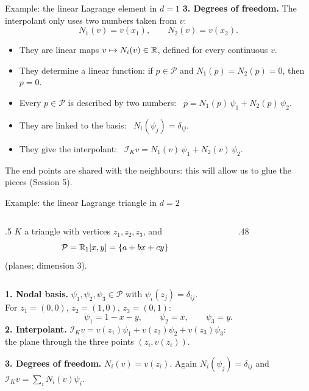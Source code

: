 \begin{frame}{Example: the linear Lagrange element in $d = 1$}
    \textbf{3. Degrees of freedom.} The interpolant only uses two numbers taken from $v$:
    \[
        N_1(v) = v(x_1), \qquad N_2(v) = v(x_2).
    \]
    \begin{itemize}
        \item They are linear maps $v \mapsto N_i(v) \in {\mathbb R}$, defined for every continuous $v$.
        \item They determine a linear function: if $p \in \mathcal P$ and $N_1(p) = N_2(p) = 0$, then $p = 0$.
        \item Every $p \in \mathcal P$ is described by two numbers: \ $p = N_1(p)\, \psi_1 + N_2(p)\, \psi_2$.
        \item They are linked to the basis: \ $N_i(\psi_j) = \delta_{ij}$.
        \item They give the interpolant: \ $\mathcal I_K v = N_1(v)\, \psi_1 + N_2(v)\, \psi_2$.
    \end{itemize}
    \bigskip
    \medskip
    {\small The end points are shared with the neighbours: this will allow us to glue the pieces (Session 5).}
\end{frame}

\begin{frame}{Example: the linear Lagrange triangle in $d = 2$}
    \begin{columns}[c,onlytextwidth]
        \begin{column}{.5\textwidth}
            $K$ a triangle with vertices $z_1, z_2, z_3$, and
            \[
                \mathcal P = {\mathbb R}_1[x,y] = \{a + bx + cy\}
            \]
            (planes; dimension $3$).
        \end{column}
        \begin{column}{.48\textwidth}
            \centering
        \end{column}
    \end{columns}
    \medskip
    \textbf{1. Nodal basis.} $\psi_1, \psi_2, \psi_3 \in \mathcal P$ with $\psi_i(z_j) = \delta_{ij}$.\\ For $z_1 = (0,0)$, $z_2 = (1,0)$, $z_3 = (0,1)$:
    \[
        \psi_1 = 1 - x - y, \qquad \psi_2 = x, \qquad \psi_3 = y.
    \]
    \textbf{2. Interpolant.} $\mathcal I_K v = v(z_1)\psi_1 + v(z_2)\psi_2 + v(z_3)\psi_3$:\\ the plane through the three points $(z_i, v(z_i))$.
    \medskip

    \textbf{3. Degrees of freedom.} $N_i(v) = v(z_i)$. Again $N_i(\psi_j) = \delta_{ij}$ and $\mathcal I_K v = \sum_i N_i(v)\psi_i$.
\end{frame}

